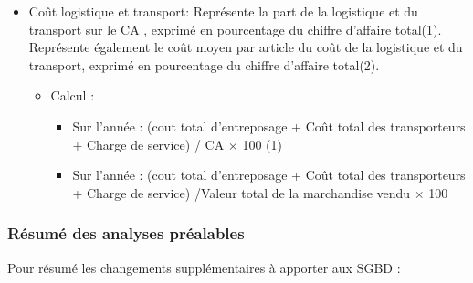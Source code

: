 \begin{itemize}
\begin{itemize}
\begin{itemize}
\begin{itemize}
						\end{itemize}						  				
				
				\end{itemize}					
	
		\end{itemize}
		
	\item Coût logistique et transport: Représente la part de la logistique et du transport sur le CA , exprimé en pourcentage du chiffre d’affaire total(1). Représente également le coût moyen par article du coût de la logistique et du transport, exprimé en pourcentage du chiffre d’affaire total(2). 
	
		\begin{itemize}
		
			\item Calcul :  
			
				\begin{itemize}
				
					\item Sur l’année : (cout total d’entreposage + Coût total des transporteurs + Charge de service) / CA $\times$ 100 	(1)			
					\item Sur l’année : (cout total d’entreposage + Coût total des transporteurs + Charge de service) /Valeur total de la marchandise vendu $\times$ 100 
				\end{itemize}						
		
		\end{itemize}
	

\end{itemize}

\vertspace  

\subsubsection{Résumé des analyses préalables} \label{Résumé}

Pour résumé les changements supplémentaires à apporter aux SGBD : 



